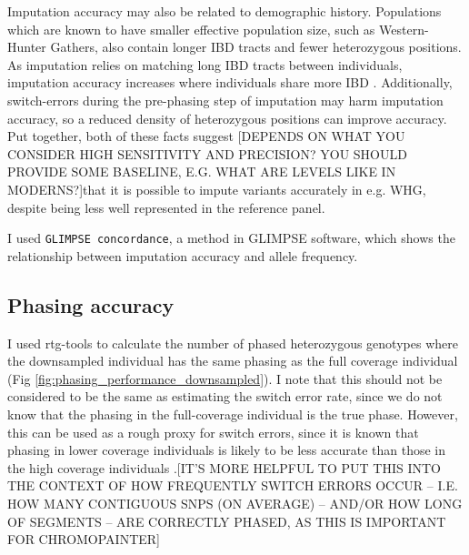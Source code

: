Imputation accuracy may also be related to demographic history. Populations which are known to have smaller effective population size, such as Western-Hunter Gathers, also contain longer IBD tracts and fewer heterozygous positions. As imputation relies on matching long IBD tracts between individuals, imputation accuracy increases where individuals share more IBD \cite{kong2008detection}. Additionally, switch-errors during the pre-phasing step of imputation may harm imputation accuracy, so a reduced density of heterozygous positions can improve accuracy. Put together, both of these facts suggest {\color{red}[DEPENDS ON WHAT YOU CONSIDER HIGH SENSITIVITY AND PRECISION? YOU SHOULD PROVIDE SOME BASELINE, E.G. WHAT ARE LEVELS LIKE IN MODERNS?]that it is possible to impute variants accurately in e.g. WHG,} despite being less well represented in the reference panel.

I used \texttt{GLIMPSE concordance}, a method in GLIMPSE software, which shows the relationship between imputation accuracy and allele frequency. 

\subsection{Phasing accuracy}

I used rtg-tools to calculate the number of phased heterozygous genotypes where the downsampled individual has the same phasing as the full coverage individual (Fig \ref{fig:phasing_performance_downsampled}). I note that this should not be considered to be the same as estimating the switch error rate, since we do not know that the phasing in the full-coverage individual is the true phase. However, this can be used as a rough proxy for switch errors, since it is known that phasing in lower coverage individuals is likely to be less accurate than those in the high coverage individuals \cite{rubinacci2021efficient}.{\color{red}[IT'S MORE HELPFUL TO PUT THIS INTO THE CONTEXT OF HOW FREQUENTLY SWITCH ERRORS OCCUR -- I.E. HOW MANY CONTIGUOUS SNPS (ON AVERAGE) -- AND/OR HOW LONG OF SEGMENTS -- ARE CORRECTLY PHASED, AS THIS IS IMPORTANT FOR CHROMOPAINTER]}

